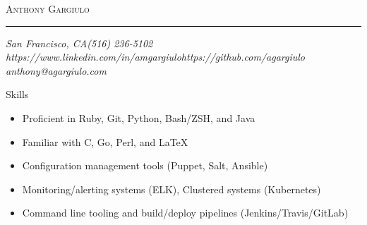 \documentclass[10pt,oneside]{article}
\makeatletter
\newcommand{\name}{Anthony Gargiulo}
\newcommand{\addr}{San Francisco, CA}
\newcommand{\mobilePhone}{(516) 236-5102}
\newcommand{\email}{anthony@agargiulo.com}
\newcommand{\github}{https://github.com/agargiulo}
\newcommand{\linkedin}{https://www.linkedin.com/in/amgargiulo}
\newcommand{\bigname}[1]{
	\begin{center}\fontfamily{bch}\selectfont\Huge\scshape#1\end{center}
}
\newenvironment{ressection}[1]{
	\vspace{3pt}
	{\fontfamily{bch}\selectfont\Large#1}
	\begin{itemize}
	\vspace{2pt}
}{
	\end{itemize}
}
\newcommand{\ressubitem}[1]{
	\vspace{-1pt}
	\item \begin{flushleft} #1 \end{flushleft}
}
\makeatother
\begin{document}
 \selectfont

\bigname{\name}

\vspace{-4pt} \rule{\textwidth}{1pt}

\vspace{-1pt} {\normalsize\itshape \addr \hfill \mobilePhone \\ \linkedin \hfill \github \\ \email}

\vspace{15 pt}



\begin{ressection}{Skills}
	\ressubitem{Proficient in Ruby, Git, Python, Bash/ZSH, and Java}
	\ressubitem{Familiar with C, Go, Perl, and \LaTeX}
	\ressubitem{Configuration management tools (Puppet, Salt, Ansible)}
	\ressubitem{Monitoring/alerting systems (ELK), Clustered systems (Kubernetes)}
	\ressubitem{Command line tooling and build/deploy pipelines (Jenkins/Travis/GitLab)}
\end{ressection}
\end{document}
